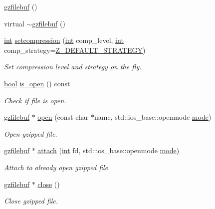 \begin{DoxyCompactItemize}
\item 
\mbox{\hyperlink{classgzfilebuf_aa08da094521bfa645427c0ae4c851504}{gzfilebuf}} ()
\item 
virtual \mbox{\hyperlink{classgzfilebuf_acb95da35cfe68e16fc85cac62453451d}{$\sim$gzfilebuf}} ()
\item 
\mbox{\hyperlink{ioapi_8h_a787fa3cf048117ba7123753c1e74fcd6}{int}} \mbox{\hyperlink{classgzfilebuf_ad109ea4fc4ca7cc19d8014b53375255d}{setcompression}} (\mbox{\hyperlink{ioapi_8h_a787fa3cf048117ba7123753c1e74fcd6}{int}} comp\+\_\+level, \mbox{\hyperlink{ioapi_8h_a787fa3cf048117ba7123753c1e74fcd6}{int}} comp\+\_\+strategy=\mbox{\hyperlink{zlib_8h_a580d7c2527e653ddd783109271750849}{Z\+\_\+\+D\+E\+F\+A\+U\+L\+T\+\_\+\+S\+T\+R\+A\+T\+E\+GY}})
\begin{DoxyCompactList}\small\item\em Set compression level and strategy on the fly. \end{DoxyCompactList}\item 
\mbox{\hyperlink{libretro_8h_a4a26dcae73fb7e1528214a068aca317e}{bool}} \mbox{\hyperlink{classgzfilebuf_a24dfb3e35c147aaf3a562c1ea4268757}{is\+\_\+open}} () const
\begin{DoxyCompactList}\small\item\em Check if file is open. \end{DoxyCompactList}\item 
\mbox{\hyperlink{classgzfilebuf}{gzfilebuf}} $\ast$ \mbox{\hyperlink{classgzfilebuf_a78281ba60675bf8727e92ed23b4a2cc9}{open}} (const char $\ast$name, std\+::ios\+\_\+base\+::openmode \mbox{\hyperlink{ioapi_8h_a7e43d41c2fe013a373b540cba02505cf}{mode}})
\begin{DoxyCompactList}\small\item\em Open gzipped file. \end{DoxyCompactList}\item 
\mbox{\hyperlink{classgzfilebuf}{gzfilebuf}} $\ast$ \mbox{\hyperlink{classgzfilebuf_a72889233c00bfd297ca01723cc4ed8fc}{attach}} (\mbox{\hyperlink{ioapi_8h_a787fa3cf048117ba7123753c1e74fcd6}{int}} fd, std\+::ios\+\_\+base\+::openmode \mbox{\hyperlink{ioapi_8h_a7e43d41c2fe013a373b540cba02505cf}{mode}})
\begin{DoxyCompactList}\small\item\em Attach to already open gzipped file. \end{DoxyCompactList}\item 
\mbox{\hyperlink{classgzfilebuf}{gzfilebuf}} $\ast$ \mbox{\hyperlink{classgzfilebuf_a280d1c661fb371c22de1214d5a1682a2}{close}} ()
\begin{DoxyCompactList}\small\item\em Close gzipped file. \end{DoxyCompactList}\end{DoxyCompactItemize}
